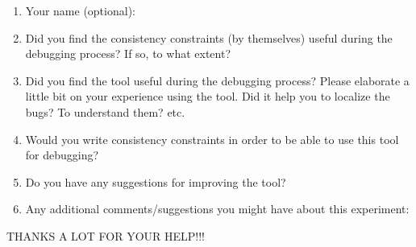\documentclass{article}
\title{}
\author{Debugging experiment - Exit survey for population 2}
\date{July 30, 2003}
\begin{document}
\maketitle
\begin{flushleft}
\vspace{0.5in}

\thispagestyle{empty}

\begin{enumerate}
\item{Your name (optional):}
\item{Did you find the consistency constraints (by themselves) useful during the debugging process?  If so, to what extent?\vspace{0.3in}}
\item{Did you find the tool useful during the debugging process?  Please elaborate a little bit on your experience using the tool.  Did it help you to localize the bugs?  To understand them?  etc.\vspace{1.2in}}
\item{Would you write consistency constraints in order to be able to use this tool for debugging?\vspace{0.3in}}
\item{Do you have any suggestions for improving the tool?\vspace{0.5in}}
\item{Any additional comments/suggestions you might have about this experiment:}
\end{enumerate}


\vspace{2.5in}
\begin{center}
THANKS A LOT FOR YOUR HELP!!!
\end{center}

\end{flushleft}
\end{document}
